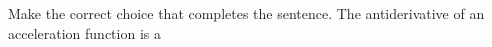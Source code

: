 \documentclass{ximera}
\author{Gregory Hartman \and Matthew Carr}
\begin{document}
\begin{exercise}
Make the correct choice that completes the sentence.
The antiderivative of an acceleration function is a
\begin{multipleChoice}
\end{multipleChoice}


\end{exercise}
\end{document}
